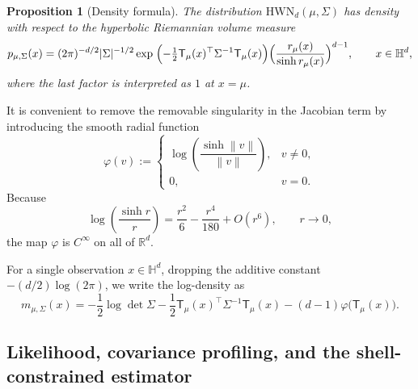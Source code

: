 \documentclass[11pt]{article}
\newtheorem{proposition}[theorem]{Proposition}
\newcommand{\R}{\mathbb{R}}
\newcommand{\Hh}{\mathbb{H}}
\newcommand{\norm}[1]{\left\lVert #1\right\rVert}
\newcommand{\psiwrap}{\varphi}
\newcommand{\T}{\mathsf{T}}
\begin{document}
\begin{proposition}[Density formula]
\label{prop:density}
The distribution $\mathrm{HWN}_d(\mu,\Sigma)$ has density with respect to the hyperbolic Riemannian volume measure
\begin{equation}
\label{eq:density}
p_{\mu,\Sigma}(x)
=(2\pi)^{-d/2}|\Sigma|^{-1/2}
\exp\;\Bigl(-\tfrac12\T_\mu(x)^\top\Sigma^{-1}\T_\mu(x)\Bigr)
\Bigl(\frac{r_\mu(x)}{\sinh r_\mu(x)}\Bigr)^{d-1},
\qquad x\in\Hh^d,
\end{equation}
where the last factor is interpreted as $1$ at $x=\mu$.
\end{proposition}



It is convenient to remove the removable singularity in the Jacobian term by introducing the smooth radial function
\begin{equation}
\label{eq:phi-def}
\psiwrap(v):=
\begin{cases}
\log\left(\dfrac{\sinh \norm{v}}{\norm{v}}\right), & v\neq 0,\\[0.75em]
0, & v=0.
\end{cases}
\end{equation}
Because
\[
\log\left(\frac{\sinh r}{r}\right)=\frac{r^2}{6}-\frac{r^4}{180}+O(r^6),
\qquad r\to 0,
\]
the map $\psiwrap$ is $C^\infty$ on all of $\R^d$.

For a single observation $x\in\Hh^d$, dropping the additive constant $-(d/2)\log(2\pi)$, we write the log-density as
\begin{equation}
\label{eq:single-loglik}
m_{\mu,\Sigma}(x)
=
-\frac12\log\det\Sigma
-\frac12\T_\mu(x)^\top\Sigma^{-1}\T_\mu(x)
-(d-1)\psiwrap\bigl(\T_\mu(x)\bigr).
\end{equation}

\subsection{Likelihood, covariance profiling, and the shell-constrained estimator}
\end{document}

